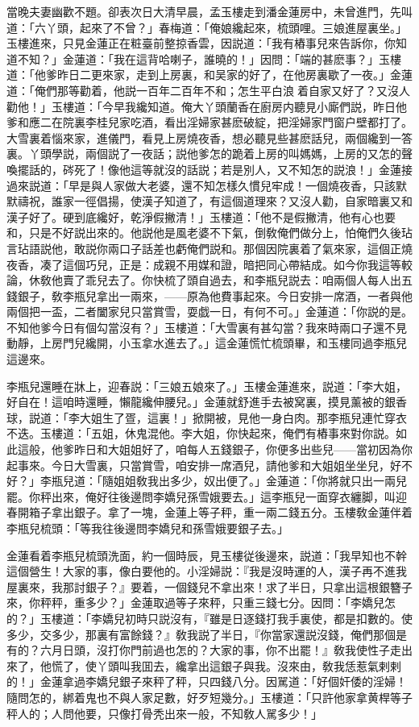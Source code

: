 當晚夫妻幽歡不題。卻表次日大清早晨，孟玉樓走到潘金蓮房中，未曾進門，先叫道：「六丫頭，起來了不曾？」春梅道：「俺娘纔起來，梳頭哩。三娘進屋裏坐。」玉樓進來，只見金蓮正在粧臺前整掠香雲，因説道：「我有樁事兒來告訴你，你知道不知？」金蓮道：「我在這背哈喇子，誰曉的！」因問：「端的甚麽事？」玉樓道：「他爹昨日二更來家，走到上房裏，和吴家的好了，在他房裏歇了一夜。」金蓮道：「俺們那等勸着，他説一百年二百年不和；怎生平白浪𢵞着自家又好了？又沒人勸他！」玉樓道：「今早我纔知道。俺大丫頭蘭香在廚房内聽見小廝們説，昨日他爹和應二在院裏李桂兒家吃酒，看出淫婦家甚麽破綻，把淫婦家門窗户壁都打了。大雪裏着惱來家，進儀門，看見上房燒夜香，想必聽見些甚麽話兒，兩個纔到一答裏。丫頭學説，兩個説了一夜話；説他爹怎的跪着上房的叫媽媽，上房的又怎的聲喚擺話的，硶死了！像他這等就沒的話説；若是別人，又不知怎的説浪！」金蓮接過來説道：「早是與人家做大老婆，還不知怎樣久慣兒牢成！一個燒夜香，只該默默禱祝，誰家一徑倡揚，使漢子知道了，有這個道理來？又沒人勸，自家暗裏又和漢子好了。硬到底纔好，乾淨假撇清！」玉樓道：「他不是假撇清，他有心也要和，只是不好説出來的。他説他是風老婆不下氣，倒敎俺們做分上，怕俺們久後玷言玷語説他，敢説你兩口子話差也虧俺們説和。那個因院裏着了氣來家，這個正燒夜香，凑了這個巧兒，正是：成親不用媒和證，暗把同心帶結成。如今你我這等較論，休敎他賣了乖兒去了。你快梳了頭自過去，和李瓶兒説去：咱兩個人每人出五錢銀子，敎李瓶兒拿出一兩來，——原為他費事起來。今日安排一席酒，一者與他兩個把一盃，二者闔家兒只當賞雪，耍戯一日，有何不可。」金蓮道：「你説的是。不知他爹今日有個勾當沒有？」玉樓道：「大雪裏有甚勾當？我來時兩口子還不見動靜，上房門兒纔開，小玉拿水進去了。」這金蓮慌忙梳頭畢，和玉樓同過李瓶兒這邊來。

李瓶兒還睡在牀上，迎春説：「三娘五娘來了。」玉樓金蓮進來，説道：「李大姐，好自在！這咱時還睡，懶龍纔伸腰兒。」金蓮就舒進手去被窝裏，摸見薰被的銀香球，説道：「李大姐生了疍，這裏！」掀開被，見他一身白肉。那李瓶兒連忙穿衣不迭。玉樓道：「五姐，休鬼混他。李大姐，你快起來，俺們有樁事來對你説。如此這般，他爹昨日和大姐姐好了，咱每人五錢銀子，你便多出些兒——當初因為你起事來。今日大雪裏，只當賞雪，咱安排一席酒兒，請他爹和大姐姐坐坐兒，好不好？」李瓶兒道：「隨姐姐敎我出多少，奴出便了。」金蓮道：「你將就只出一兩兒罷。你秤出來，俺好往後邊問李嬌兒孫雪娥要去。」這李瓶兒一面穿衣纏脚，叫迎春開箱子拿出銀子。拿了一塊，金蓮上等子秤，重一兩二錢五分。玉樓敎金蓮伴着李瓶兒梳頭：「等我往後邊問李嬌兒和孫雪娥要銀子去。」

金蓮看着李瓶兒梳頭洗面，約一個時辰，見玉樓従後邊來，説道：「我早知也不幹這個營生！大家的事，像白要他的。小淫婦説：『我是沒時運的人，漢子再不進我屋裏來，我那討銀子？』要着，一個錢兒不拿出來！求了半日，只拿出這根銀簪子來，你秤秤，重多少？」金蓮取過等子來秤，只重三錢七分。因問：「李嬌兒怎的？」玉樓道：「李嬌兒初時只説沒有，『雖是日逐錢打我手裏使，都是扣數的。使多少，交多少，那裏有富餘錢？』敎我説了半日，『你當家還説沒錢，俺們那個是有的？六月日頭，沒打你門前過也怎的？大家的事，你不出罷！』敎我使性子走出來了，他慌了，使丫頭叫我囬去，纔拿出這銀子與我。沒來由，敎我恁惹氣剌剌的！」金蓮拿過李嬌兒銀子來秤了秤，只四錢八分。因駡道：「好個奸倭的淫婦！隨問怎的，綁着鬼也不與人家足數，好歹短幾分。」玉樓道：「只許他家拿黄桿等子秤人的；人問他要，只像打骨秃出來一般，不知敎人駡多少！」

